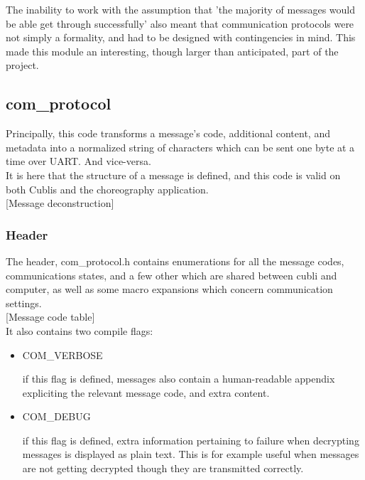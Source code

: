 The inability to work with the assumption that 'the majority of messages would be able get through successfully' also meant that communication protocols were not simply a formality, and had to be designed with contingencies in mind. This made this module an interesting, though larger than anticipated, part of the project.

\subsection{com\_protocol}

Principally, this code transforms a message's code, additional content, and metadata into a normalized string of characters which can be sent one byte at a time over UART. And vice-versa.\\

It is here that the structure of a message is defined, and this code is valid on both Cublis and the choreography application.\\

[Message deconstruction] \\


\subsubsection{Header}

The header, com\_protocol.h contains enumerations for all the message codes, communications states, and a few other which are shared between cubli and computer, as well as some macro expansions which concern communication settings.\\

[Message code table]\\

It also contains two compile flags:\\

\begin{itemize}
\item[] COM\_VERBOSE

	if this flag is defined, messages also contain a human-readable appendix expliciting the relevant message code, and extra content.\\

\item[] COM\_DEBUG

	if this flag is defined, extra information pertaining to failure when decrypting messages is displayed as plain text. This is for example useful when messages are not getting decrypted though they are transmitted correctly.
    
\end{itemize}

